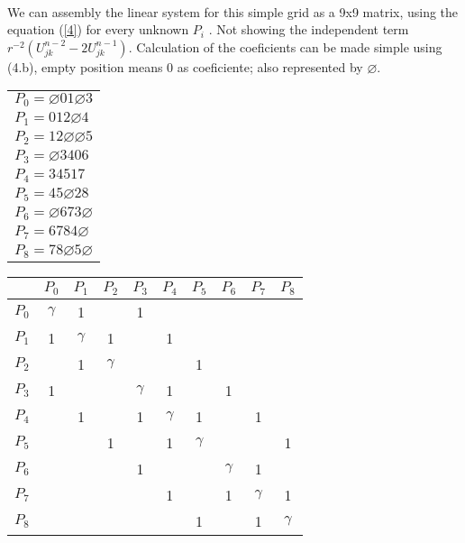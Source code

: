 \documentclass[legalpaper, 12pt]{article}
\begin{document}
\
\newline

We can assembly the linear system for this simple grid as a 9x9 matrix, using the equation (\ref{4}) for every unknown $ P_i $ . Not showing the independent term $  r^{-2} \left( U_{jk}^{n-2} -2 U_{jk}^{n-1} \right) $. Calculation of the coeficients can be made simple  using (4.b), empty position means 0 as coeficiente; also represented by $ \varnothing $.

\begin{center}
\begin{tabular}{ l }
$ P_0 = \varnothing  0  1  \varnothing 3  $ \\
$ P_1 = 0 1 2 \varnothing 4 $ \\
$ P_2 = 1 2 \varnothing \varnothing 5 $ \\
$ P_3 = \varnothing 3 4 0 6 $\\
$ P_4 = 3 4 5 1 7 $\\
$ P_5 = 4 5 \varnothing 2 8 $\\
$ P_6 = \varnothing 6 7 3 \varnothing $\\
$ P_7 = 6 7 8 4 \varnothing $\\
$ P_8 = 7 8 \varnothing 5 \varnothing $\\
\end{tabular}
\end{center}

\begin{center}
\begin{tabular}{| c | c | c | c | c | c | c | c | c | c |}
\hline
	        & $ P_0 $ & $ P_1 $ & $ P_2 $ & $ P_3 $ & $ P_4 $ & $ P_5 $ & $ P_6 $ & $ P_7 $ & $ P_8 $ \\ \hline
	$ P_0 $ &$\gamma$ &    1    &         &    1    &         &         &         &         &         \\ \hline
	$ P_1 $ &    1    &$\gamma$ &     1   &         &     1   &         &         &         &         \\ \hline
	$ P_2 $ &         &    1    &$\gamma$ &         &         &    1    &         &         &         \\ \hline
	$ P_3 $ &    1    &         &         &$\gamma$ &    1    &         &    1    &         &         \\ \hline
	$ P_4 $ &         &    1    &         &    1    &$\gamma$ &    1    &         &    1    &         \\ \hline
	$ P_5 $ &         &         &    1    &         &    1    &$\gamma$ &         &         &    1    \\ \hline
	$ P_6 $ &         &         &         &    1    &         &         &$\gamma$ &    1    &         \\ \hline
	$ P_7 $ &         &         &         &         &    1    &         &    1    &$\gamma$ &    1    \\ \hline
    $ P_8 $ &         &         &         &         &         &    1    &         &    1    &$\gamma$ \\ \hline
\end{tabular} 
\end{center}
\end{document}
